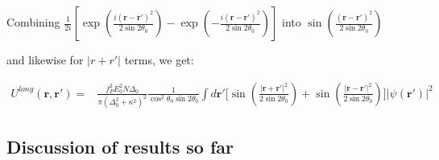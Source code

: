 \documentclass[a4paper,nobalancelastpage]{revtex4-1}
\newcommand{\vect}[1]{\bm{#1}}
\newcommand{\abs}[1]{\lvert #1 \rvert}
\begin{document}
Combining $\frac{1}{2 i}\left[\exp\left(\frac{i (\vect{r}-\vect{r}')^2}{2 \sin 2\theta_0} \right) - \exp\left(-\frac{i (\vect{r}-\vect{r}')^2}{2 \sin 2\theta_0} \right)  \right]$ into $\sin \left( \frac{(\vect{r}-\vect{r}')^2}{2 \sin 2\theta_0} \right)$

and likewise for $\abs{r+r'}$ terms, we get:

\begin{align}
U^{long}(\vect{r},\vect{r}')=& 
\frac{ f_P^2 E^2_0 N \Delta_0 }{\pi (\Delta_0^2+\kappa^2)^2}  \frac{1}{\cos^2 \theta_0 \sin 2\theta_0}
\int d \vect{r}' \bigg[ \sin{\left( \frac{\abs{\vect{r}+\vect{r}'}^2}{2 \sin 2\theta_0} \right)} + \sin{\left( \frac{\abs{\vect{r}-\vect{r}'}^2}{2 \sin 2\theta_0} \right)} \bigg] \abs{\psi(\vect{r}')}^2
\end{align}

\subsection{Discussion of results so far}
\end{document}

